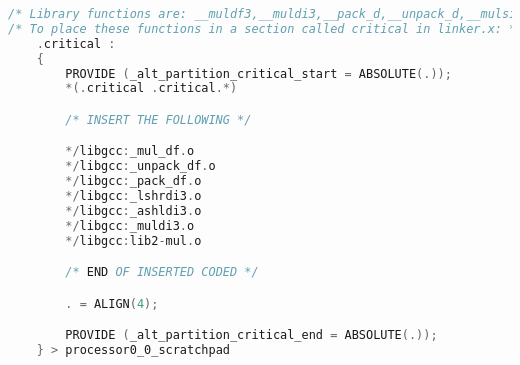 % 
% 
% 
% 
% 
% 
% 
% 
% 
%  
% 
% 
% 
\begin{lstlisting}[caption={Placing library functions in \texttt{.critical} region},label=l:jlib,language=C]
/* Library functions are: __muldf3,__muldi3,__pack_d,__unpack_d,__mulsi3,__lshrdi3,__ashldi3 */
/* To place these functions in a section called critical in linker.x: */
    .critical :
    {
        PROVIDE (_alt_partition_critical_start = ABSOLUTE(.));
        *(.critical .critical.*)

        /* INSERT THE FOLLOWING */

        */libgcc:_mul_df.o
        */libgcc:_unpack_df.o
        */libgcc:_pack_df.o
        */libgcc:_lshrdi3.o
        */libgcc:_ashldi3.o
        */libgcc:_muldi3.o
        */libgcc:lib2-mul.o

        /* END OF INSERTED CODED */

        . = ALIGN(4);

        PROVIDE (_alt_partition_critical_end = ABSOLUTE(.));
    } > processor0_0_scratchpad


\end{lstlisting}


